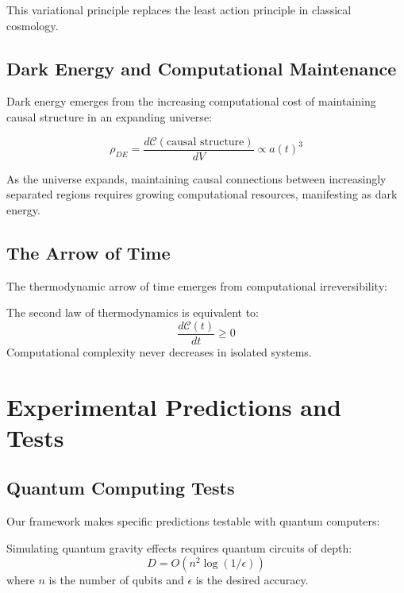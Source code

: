 \documentclass[12pt,a4paper]{article}
\newcommand{\comp}[1]{\mathcal{C}(#1)}
\begin{document}
This variational principle replaces the least action principle in classical cosmology.

\subsection{Dark Energy and Computational Maintenance}

Dark energy emerges from the increasing computational cost of maintaining causal structure in an expanding universe:

\begin{equation}
\rho_{DE} = \frac{d\comp{\text{causal structure}}}{dV} \propto a(t)^3
\end{equation}

As the universe expands, maintaining causal connections between increasingly separated regions requires growing computational resources, manifesting as dark energy.

\subsection{The Arrow of Time}

The thermodynamic arrow of time emerges from computational irreversibility:

\begin{theorem}
The second law of thermodynamics is equivalent to:
\begin{equation}
\frac{d\comp{t}}{dt} \geq 0
\end{equation}
Computational complexity never decreases in isolated systems.
\end{theorem}

\section{Experimental Predictions and Tests}

\subsection{Quantum Computing Tests}

Our framework makes specific predictions testable with quantum computers:

\begin{proposition}
Simulating quantum gravity effects requires quantum circuits of depth:
\begin{equation}
D = O(n^2 \log(1/\epsilon))
\end{equation}
where $n$ is the number of qubits and $\epsilon$ is the desired accuracy.
\end{proposition}
\end{document}
